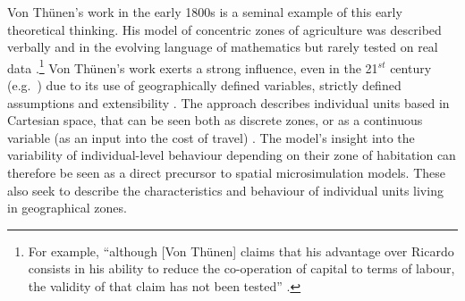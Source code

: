 Von Th\"{u}nen's work in the early 1800s is a seminal example of this early
theoretical thinking. His model of concentric zones of agriculture was
described verbally and in the evolving language of mathematics but rarely tested
on real data \citep{Moore1895-thesis}.\footnote{For
example, ``although [Von
Th\"{u}nen] claims that his advantage over Ricardo consists in his ability to
reduce the co-operation of capital to terms of labour, the validity of that
claim has not been tested'' \citep[p.~126]{Moore1895-thesis}.
} 
Von Th\"{u}nen's work exerts a strong
influence, even in the 21$^{st}$ century (e.g.~\citealp{lankoski2008bioenergy}) 
due to its use of geographically defined variables, strictly 
defined assumptions and extensibility \citep{sasaki2003agent}. 
The approach describes individual units based in
Cartesian space, that can be seen both as discrete zones, or as
a continuous variable (as an input into the cost of travel)
\citep{Stevens1968a}. The model's insight into the variability of
individual-level behaviour depending on their zone of habitation can therefore
be seen as a direct precursor to spatial microsimulation models. These also
seek to describe the characteristics and behaviour of individual units living in
geographical zones.

